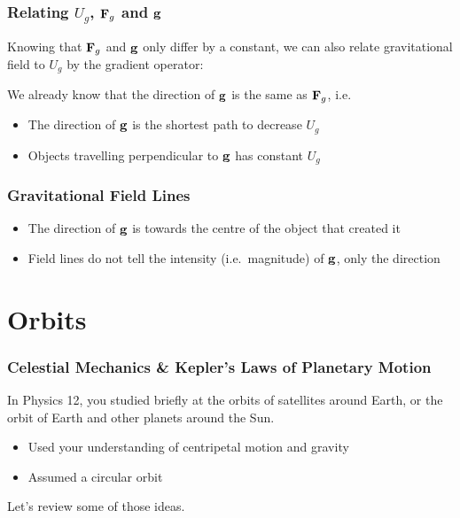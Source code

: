 \documentclass[12pt,compress,aspectratio=169]{beamer}
\newcommand{\mb}[1]{\ensuremath\mathbf{#1}}
\begin{document}
\begin{frame}
  \frametitle{Relating $U_g$, $\mb{F}_g$ and $\mb{g}$}
  Knowing that $\mb{F}_g$ and $\mb{g}$ only differ by a constant, we can
  also relate gravitational field to $U_g$ by the gradient operator:

  \vspace{-0.1in}{\Large
    \begin{displaymath}
      \mb{g}=\frac{\mb{F}_g}{m}=-\nabla\left(\frac{U_g}{m}\right)=
      -\frac{\partial}{\partial r}\left(\frac{U_g}{m}\right)
      \hat{\mb{r}}
    \end{displaymath}
  }

  We already know that the direction of $\mb{g}$ is the same as $\mb{F}_g$,
  i.e.
  \begin{itemize}
  \item The direction of $\mb{g}$ is the shortest path to decrease $U_g$ 
  \item Objects travelling perpendicular to $\mb{g}$ has constant $U_g$
  \end{itemize}
\end{frame}


\begin{frame}
  \frametitle{Gravitational Field Lines}
  \begin{center}
  \end{center}
  \begin{itemize}
  \item The direction of $\mb{g}$ is towards the centre of the object that
    created it
  \item Field lines do not tell the intensity (i.e.\ magnitude) of $\mb{g}$,
    only the direction
  \end{itemize}
\end{frame}



\section{Orbits}

\begin{frame}
  \frametitle{Celestial Mechanics \& Kepler's Laws of Planetary Motion}
  In Physics 12, you studied briefly at the orbits of satellites around Earth,
  or the orbit of Earth and other planets around the Sun.
  \begin{itemize}
  \item Used your understanding of centripetal motion and gravity
  \item Assumed a circular orbit
  \end{itemize}
  Let's review some of those ideas.
\end{frame}
\end{document}
